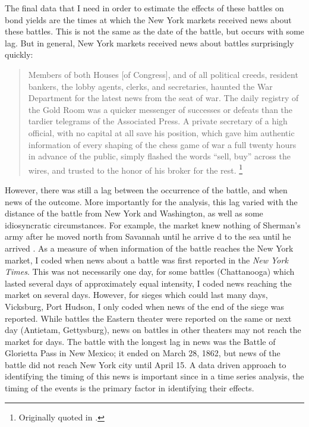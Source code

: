 The final data that I need in order to estimate the effects of these battles on bond yields are the times at which the New York markets received news about these battles.
This is not the same as the date of the battle, but occurs with some lag.
But in general, New York markets received news about battles surprisingly quickly:
\begin{quote}
Members of both Houses [of Congress], and of all political creeds, resident bankers, the lobby agents, clerks, and secretaries, haunted the War Department for the latest news from the seat of war.
The daily registry of the Gold Room was a quicker messenger of successes or defeats than the tardier telegrams of the Associated Press. A private secretary of a high official, with no capital at all save his position, which gave him authentic information of every shaping of the chess game of war a full twenty hours in advance of the public, simply flashed the words ``sell, buy'' across the wires, and trusted to the honor of his broker for the rest. \parencite[245]{Medbery1870a}\footnote{Originally quoted in \textcite{WillardGuinnaneEtAl1996}.}
\end{quote}
However, there was still a lag between the occurrence of the battle, and when news of the outcome.
More importantly for the analysis, this lag varied with the distance of the battle from New York and Washington, as well as some idiosyncratic circumstances.
For example, the market knew nothing of Sherman's army after he moved north from Savannah until he arrive d  to the sea until he arrived  \textcite[204]{Mitchell1903}.
As a measure of when information of the battle reaches the New York market, I coded when news about a battle was first reported in the \textit{New York Times}.
This was not necessarily one day, for some battles (Chattanooga) which lasted several days of approximately equal intensity, I coded news reaching the market on several days.
However, for sieges which could last many days, \eg{}Vicksburg, Port Hudson, I only coded when news of the end of the siege was reported.
While battles the Eastern theater were reported on the same or next day (Antietam, Gettysburg), news on battles in other theaters may not reach the market for days.
The battle with the longest lag in news was the Battle of Glorietta Pass in New Mexico; it ended on March 28, 1862, but news of the battle did not reach New York city until April 15.
A data driven approach to identifying the timing of this news is important since in a time series analysis, the timing of the events is the primary factor in identifying their effects.

